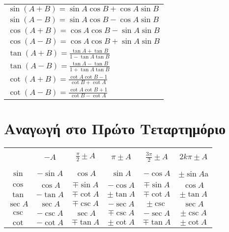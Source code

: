 \begin{tabular}{l}
    $ \sin{(A+B)} = \sin{A} \cos{B} + \cos{A} \sin{B} $ \\
    $ \sin{(A-B)} = \sin{A} \cos{B} - \cos{A} \sin{B} $ \\
    $ \cos{(A+B)} = \cos{A} \cos{B} - \sin{A} \sin{B} $ \\
    $ \cos{(A-B)} = \cos{A} \cos{B} + \sin{A} \sin{B} $ \\
    $ \tan{(A+B)} = \frac{\tan{A} + \tan{B}}{1 - \tan{A} \tan{B}} $ \\
    $ \tan{(A-B)} = \frac{\tan{A} - \tan{B}}{1 + \tan{A} \tan{B}} $ \\ 
    $ \cot{(A+B)} = \frac{\cot{A} \cot{B} - 1}{\cot{B} + \cot{A}} $ \\
    $ \cot{(A-B)} = \frac{\cot{A} \cot{B} + 1}{\cot{B} - \cot{A}} $ 
\end{tabular}

\section{Αναγωγή στο Πρώτο Τεταρτημόριο}

\begin{center}
\begin{tabular}{*{6}c}
    \toprule \\
    & $ -A $  & $ \frac{\pi}{2} \pm A $ & $ \pi \pm A $ & $ \frac{3 \pi}{2}
    \pm A $ & $ 2k \pi \pm A $ \\
    \midrule \\
    $ \sin{} $ & $ - \sin{A} $ & $ \cos{A} $ & $ \sin{A} $ & $ - \cos{A}
    $ & $ \pm \sin{A} $a \\
    $ \cos $ & $ \cos{A}  $ & $ \mp \sin{A} $ & $ - \cos{A} $ & $ \mp
    \sin{A} $ & $ \cos{A} $ \\
    $ \tan{} $ & $ - \tan{A} $ & $ \mp \cot{A} $ & $ \pm \tan{A} $ & $ \mp
    \cot{A} $ & $ \pm \tan{A} $ \\
    $ \sec{A} $ & $ \sec{A} $ & $ \mp \csc{A} $ & $ - \sec{A} $ & $ \pm
    \csc{} $ & $ \sec{A} $ \\
    $ \csc{} $ & $ - \csc{A} $ & $ \sec{A} $ & $ \mp \csc{A} $ & $ - \sec{A}$ &
    $ \pm \csc{A} $ \\
    $ \cot{} $ & $ - \cot{A} $ & $ \mp \tan{A} $ & $ \pm \cot{A} $ & $ \mp
    \tan{A} $ & $ \pm \cot{A} $ \\ 
    \bottomrule
\end{tabular}
\end{center}


